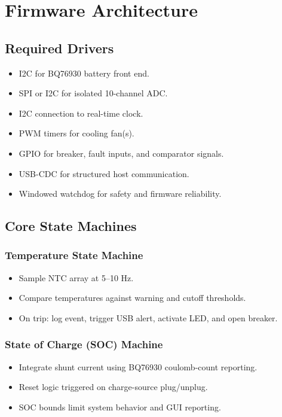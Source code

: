 \documentclass[12pt]{article}
\begin{document}
\section{Firmware Architecture}

\subsection{Required Drivers}

\begin{itemize}
\item I2C for BQ76930 battery front end.
\item SPI or I2C for isolated 10-channel ADC.
\item I2C connection to real-time clock.
\item PWM timers for cooling fan(s).
\item GPIO for breaker, fault inputs, and comparator signals.
\item USB-CDC for structured host communication.
\item Windowed watchdog for safety and firmware reliability.
\end{itemize}

\subsection{Core State Machines}

\subsubsection{Temperature State Machine}

\begin{itemize}
\item Sample NTC array at 5--10 Hz.
\item Compare temperatures against warning and cutoff thresholds.
\item On trip: log event, trigger USB alert, activate LED, and open breaker.
\end{itemize}

\subsubsection{State of Charge (SOC) Machine}

\begin{itemize}
\item Integrate shunt current using BQ76930 coulomb-count reporting.
\item Reset logic triggered on charge-source plug/unplug.
\item SOC bounds limit system behavior and GUI reporting.
\end{itemize}
\end{document}
